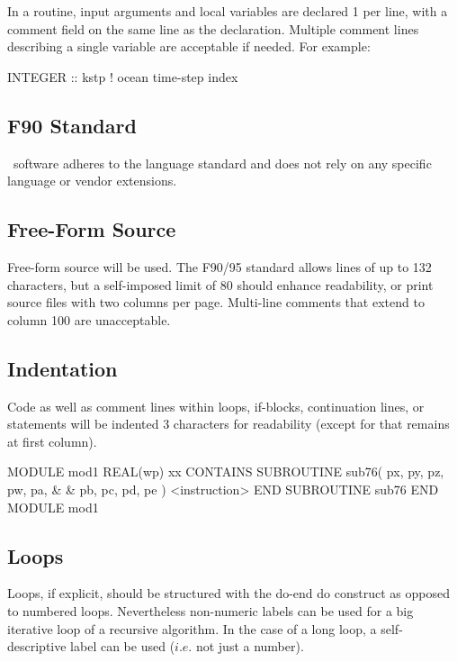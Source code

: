 In a routine, input arguments and local variables are declared 1 per line,
with a comment field on the same line as the declaration.
Multiple comment lines describing a single variable are acceptable if needed.
For example:

\begin{forlines}
INTEGER             ::   kstp   ! ocean time-step index
\end{forlines}

\subsection{F90 Standard}

\NEMO\ software adheres to the \fninety language standard and does not rely on any specific language or
vendor extensions.

\subsection{Free-Form Source}

Free-form source will be used.
The F90/95 standard allows lines of up to 132 characters, but a self-imposed limit of 80 should enhance readability,
or print source files with two columns per page.
Multi-line comments that extend to column 100 are unacceptable.

\subsection{Indentation}

Code as well as comment lines within loops, if-blocks, continuation lines,  or
 statements will be indented 3 characters for readability
(except for  that remains at first column).

\begin{forlines}
MODULE mod1
   REAL(wp) xx
CONTAINS
   SUBROUTINE sub76( px, py, pz, pw, pa,   &
      &              pb, pc, pd, pe          )
      <instruction>
   END SUBROUTINE sub76
END MODULE mod1
\end{forlines}

\subsection{Loops}

Loops, if explicit, should be structured with the do-end do construct as opposed to numbered loops.
Nevertheless non-numeric labels can be used for a big iterative loop of a recursive algorithm.
In the case of a long loop, a self-descriptive label can be used ($i.e.$ not just a number).

